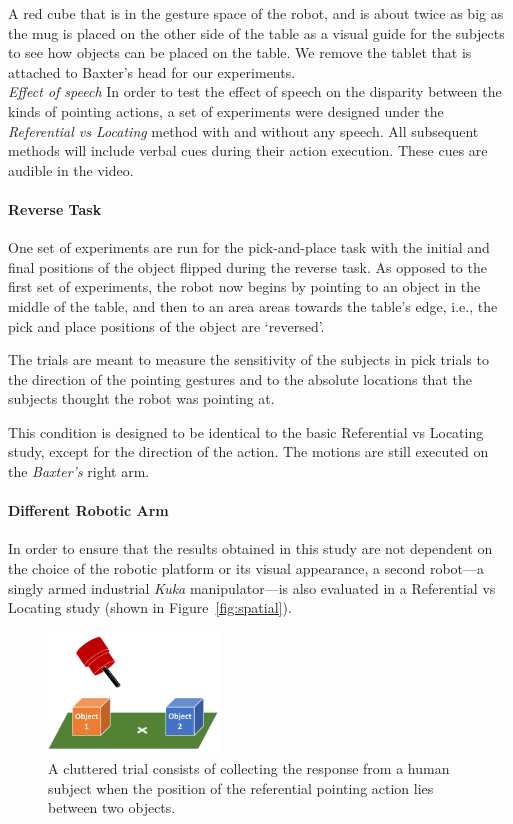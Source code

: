 \documentclass[letterpaper]{article} %
\begin{document}
A red cube that is in the gesture space of the robot, and is about twice as big as the mug is placed on the other side of the table as a visual guide for the subjects to see how objects can be placed on the table. We remove the tablet that is attached to Baxter's head for our experiments.\\ 

\noindent\textit{Effect of speech} In order to test the effect of speech on the disparity between the kinds of pointing actions, a set of experiments were designed under the \textit{Referential vs Locating} method with and without any speech. All subsequent methods will include verbal cues during their action execution. These cues are audible in the video.

\paragraph{Reverse Task} One set of experiments are run for the pick-and-place task with the initial and final positions of the object flipped during the reverse task. As opposed to the first set of experiments, the robot now begins by pointing to an object in the middle of the table, and then to an area areas towards the table's edge, i.e., the pick and place positions of the object are `reversed'. 

The trials are meant to measure the sensitivity of the subjects in pick trials to the direction of the pointing gestures and to the absolute locations that the subjects thought the robot was pointing at.


This condition is designed to be identical to the basic Referential vs Locating study, except for the direction of the action. The motions are still executed on the \textit{Baxter's} right arm. 

\paragraph{Different Robotic Arm}
In order to ensure that the results obtained in this study are not dependent on the choice of the robotic platform or its visual appearance, a second robot---a singly armed industrial \textit{Kuka} manipulator---is also evaluated in a Referential vs Locating study (shown in Figure~\ref{fig:spatial}).


\begin{figure}[t]
    \centering
    \includegraphics[width=0.40\textwidth]{clutter_trial.png}
    \caption{A cluttered trial consists of collecting the response from a human subject when the position of the referential pointing action lies between two objects.}
    \label{fig:cluttered_trial}
\end{figure}
\end{document}
